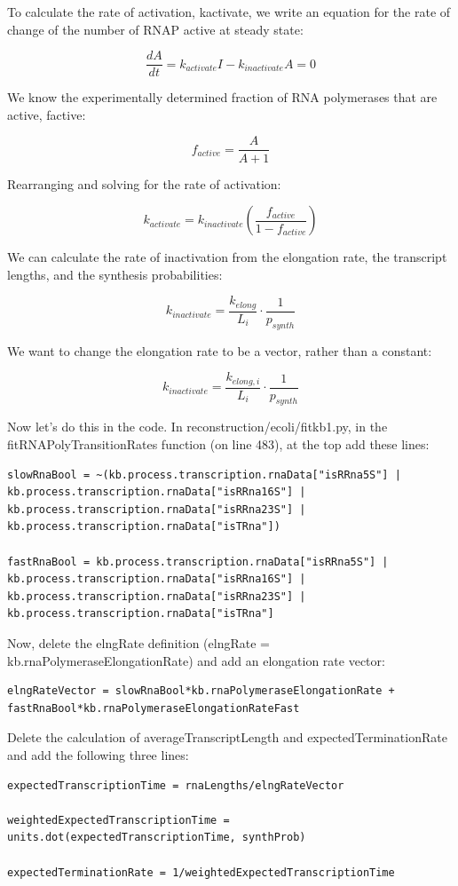 \documentclass[12pt]{article}
\begin{document}
To calculate the rate of activation, kactivate, we write an equation for the rate of change of the number of RNAP active at steady state:

$$
\frac{dA}{dt}=k_{activate}I - k_{inactivate}A=0
$$

We know the experimentally determined fraction of RNA polymerases that are active, factive:

$$
f_{active}=\frac{A}{A+1}
$$

Rearranging and solving for the rate of activation:

$$
k_{activate}=k_{inactivate}\left(\frac{f_{active}}{1-f_{active}} \right)
$$

We can calculate the rate of inactivation from the elongation rate, the transcript lengths, and the synthesis probabilities:

$$
k_{inactivate}=\frac{k_{elong}}{L_i}\cdot\frac{1}{p_{synth}}
$$

We want to change the elongation rate to be a vector, rather than a constant:

$$
k_{inactivate}=\frac{k_{elong,i}}{L_i}\cdot \frac{1}{p_{synth}}
$$

Now let’s do this in the code. In reconstruction/ecoli/fitkb1.py, in the fitRNAPolyTransitionRates function (on line 483), at the top add these lines:

\begin{lstlisting}
slowRnaBool = ~(kb.process.transcription.rnaData["isRRna5S"] | kb.process.transcription.rnaData["isRRna16S"] | kb.process.transcription.rnaData["isRRna23S"] | kb.process.transcription.rnaData["isTRna"])

fastRnaBool = kb.process.transcription.rnaData["isRRna5S"] | kb.process.transcription.rnaData["isRRna16S"] | kb.process.transcription.rnaData["isRRna23S"] | kb.process.transcription.rnaData["isTRna"]
\end{lstlisting}

Now, delete the elngRate definition (elngRate = kb.rnaPolymeraseElongationRate) and add an elongation rate vector:

\begin{lstlisting}
elngRateVector = slowRnaBool*kb.rnaPolymeraseElongationRate + fastRnaBool*kb.rnaPolymeraseElongationRateFast
\end{lstlisting}

Delete the calculation of averageTranscriptLength and expectedTerminationRate and add the following three lines:

\begin{lstlisting}
expectedTranscriptionTime = rnaLengths/elngRateVector

weightedExpectedTranscriptionTime = units.dot(expectedTranscriptionTime, synthProb)

expectedTerminationRate = 1/weightedExpectedTranscriptionTime
\end{lstlisting}
\end{document}
